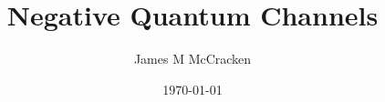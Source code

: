 \documentclass[11pt,a4paper,oneside]{book}
\title{Negative Quantum Channels}
\author{James M McCracken}
\date{\today}
\begin{document}
\maketitle
\tableofcontents
\onehalfspacing










\end{document}
